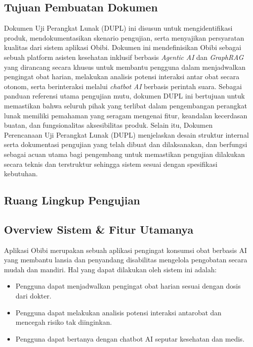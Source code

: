 \documentclass[12pt, a4paper]{article}
\begin{document}
\subsection{Tujuan Pembuatan Dokumen}

Dokumen Uji Perangkat Lunak (DUPL) ini disusun untuk mengidentifikasi produk,
mendokumentasikan skenario pengujian, serta menyajikan persyaratan kualitas dari
sistem aplikasi Obibi. Dokumen ini mendefinisikan Obibi sebagai sebuah platform
asisten kesehatan inklusif berbasis \textit{Agentic AI} dan \textit{GraphRAG}
yang dirancang secara khusus untuk membantu pengguna dalam menjadwalkan pengingat
obat harian, melakukan analisis potensi interaksi antar obat secara otonom, serta
berinteraksi melalui \textit{chatbot AI} berbasis perintah suara. Sebagai panduan
referensi utama pengujian mutu, dokumen DUPL ini bertujuan untuk memastikan bahwa
seluruh pihak yang terlibat dalam pengembangan perangkat lunak memiliki pemahaman
yang seragam mengenai fitur, keandalan kecerdasan buatan, dan fungsionalitas
aksesibilitas produk. Selain itu, Dokumen Perencanaan Uji Perangkat Lunak (DUPL)
menjelaskan desain struktur internal serta dokumentasi pengujian yang telah dibuat
dan dilaksanakan, dan berfungsi sebagai acuan utama bagi pengembang untuk
memastikan pengujian dilakukan secara teknis dan terstruktur sehingga sistem sesuai
dengan spesifikasi kebutuhan.

\subsection{Ruang Lingkup Pengujian}


\subsection{Overview Sistem \& Fitur Utamanya}

Aplikasi Obibi merupakan sebuah aplikasi pengingat konsumsi obat berbasis AI yang
membantu lansia dan penyandang disabilitas mengelola pengobatan secara mudah dan
mandiri. Hal yang dapat dilakukan oleh sistem ini adalah:

\begin{itemize}[leftmargin=2em]
  \item Pengguna dapat menjadwalkan pengingat obat harian sesuai dengan dosis dari
        dokter.
  \item Pengguna dapat melakukan analisis potensi interaksi antarobat dan mencegah
        risiko tak diinginkan.
  \item Pengguna dapat bertanya dengan chatbot AI seputar kesehatan dan medis.
\end{itemize}
\end{document}
